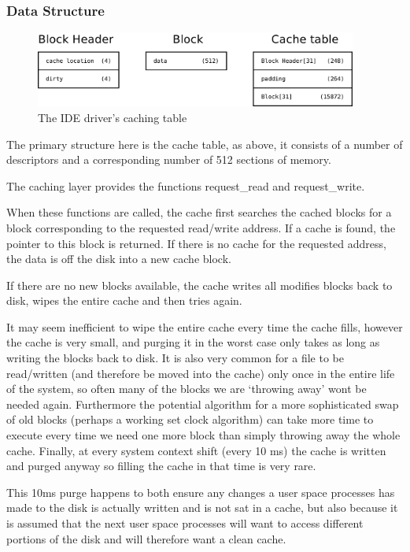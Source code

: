 \documentclass[a4paper]{report}
\begin{document}
\subsubsection{Data Structure}


\begin{figure}[ht]
\centering
\includegraphics[width=400px]{images/Caching_Table}
\caption{The IDE driver's caching table}
\label{fig:WinTitleBarScreen}
\end{figure}

The primary structure here is the cache table, as above, it consists of a number of descriptors and a corresponding number of 512 sections of memory.

The caching layer provides the functions request\_read and request\_write.

When these functions are called, the cache first searches the cached blocks for a block corresponding to the requested read/write address. If a cache is found, the pointer to this block is returned. If there is no cache for the requested address, the data is off the disk into a new cache block.

If there are no new blocks available, the cache writes all modifies blocks back to disk, wipes the entire cache and then tries again.

It may seem inefficient to wipe the entire cache every time the cache fills, however the cache is very small, and purging it in the worst case only takes as long as writing the blocks back to disk. It is also very common for a file to be read/written (and therefore be moved into the cache) only once in the entire life of the system, so often many of the blocks we are `throwing away' wont be needed again. Furthermore the potential algorithm for a more sophisticated swap of old blocks (perhaps a working set clock algorithm) can take more time to execute every time we need one more block than simply throwing away the whole cache. Finally, at every system context shift (every 10 ms) the cache is written and purged anyway so filling the cache in that time is very rare.

This 10ms purge happens to both ensure any changes a user space processes has made to the disk is actually written and is not sat in a cache, but also because it is assumed that the next user space processes will want to access different portions of the disk and will therefore want a clean cache.
\end{document}
